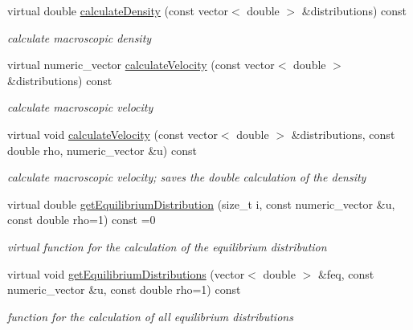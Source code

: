 \begin{DoxyCompactItemize}
\item 
virtual double \hyperlink{classnatrium_1_1CollisionModel_ae1c879c87ac210a227a8e3da2d0ac385}{calculateDensity} (const vector$<$ double $>$ \&distributions) const 
\begin{DoxyCompactList}\small\item\em calculate macroscopic density \item\end{DoxyCompactList}\item 
virtual numeric\_\-vector \hyperlink{classnatrium_1_1CollisionModel_a90428f4c29916641de3de872803dde0f}{calculateVelocity} (const vector$<$ double $>$ \&distributions) const 
\begin{DoxyCompactList}\small\item\em calculate macroscopic velocity \item\end{DoxyCompactList}\item 
virtual void \hyperlink{classnatrium_1_1CollisionModel_a667f0e36da1bfb1c5102adb8f3afdcde}{calculateVelocity} (const vector$<$ double $>$ \&distributions, const double rho, numeric\_\-vector \&u) const 
\begin{DoxyCompactList}\small\item\em calculate macroscopic velocity; saves the double calculation of the density \item\end{DoxyCompactList}\item 
virtual double \hyperlink{classnatrium_1_1CollisionModel_a88b382d63da80e950bc58e8afad769a6}{getEquilibriumDistribution} (size\_\-t i, const numeric\_\-vector \&u, const double rho=1) const =0
\begin{DoxyCompactList}\small\item\em virtual function for the calculation of the equilibrium distribution \item\end{DoxyCompactList}\item 
virtual void \hyperlink{classnatrium_1_1CollisionModel_a296474961c4501bc23228be1d30ebf82}{getEquilibriumDistributions} (vector$<$ double $>$ \&feq, const numeric\_\-vector \&u, const double rho=1) const 
\begin{DoxyCompactList}\small\item\em function for the calculation of all equilibrium distributions \item\end{DoxyCompactList}\end{DoxyCompactItemize}


